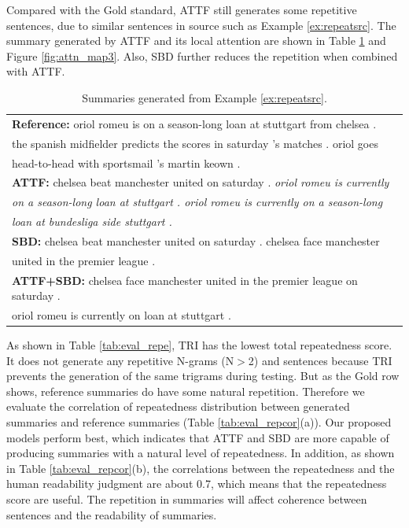 \documentclass{nle}
\theoremstyle{definition}
\newcommand{\figref}[1]{Figure \ref{#1}}
\newcommand{\tabref}[1]{Table \ref{#1}}
\newcommand{\exref}[1]{Example \ref{#1}}
\begin{document}
Compared with the Gold standard,
ATTF still generates some repetitive sentences,
due to similar sentences in source
such as \exref{ex:repeatsrc}.
The summary generated by ATTF and its local attention are
shown in \tabref{tab:src_rep} and \figref{fig:attn_map3}.
Also, SBD further reduces the repetition when combined with ATTF. 

\begin{table}[th!]
	\begin{center}
		\caption{Summaries generated from \exref{ex:repeatsrc}.}
		\begin{tabular}{|l|}%
			\hline \textbf{Reference:} oriol romeu is on a season-long loan at stuttgart from chelsea . \\
			the spanish midfielder predicts the scores in saturday 's matches . oriol goes \\
			head-to-head with sportsmail 's martin keown .\\
			\hline \textbf{ATTF:} chelsea beat manchester united on saturday . \textit{oriol romeu is currently} \\
			\textit{on a season-long loan at stuttgart . oriol romeu is currently on a season-long} \\
			\textit{loan at bundesliga side stuttgart .}\\
			\hline \textbf{SBD:} chelsea beat manchester united on saturday . chelsea face manchester \\
			united in the premier league . \\ 
			\hline \textbf{ATTF+SBD:} chelsea face manchester united in the premier league on saturday . \\
			oriol romeu is currently on loan at stuttgart . \\
			\hline
		\end{tabular}
	\end{center}
	\label{tab:src_rep}
\end{table}

As shown in \tabref{tab:eval_repe}, TRI has the lowest total repeatedness score.
It does not generate any repetitive N-grams (N$>$2) and sentences 
because TRI prevents the generation of the same trigrams during testing.
But as the Gold row shows, reference summaries do have some natural repetition.
Therefore we evaluate the correlation of repeatedness distribution between
generated summaries and reference summaries (\tabref{tab:eval_repcor}(a)).
Our proposed models perform best,
which indicates that ATTF and SBD are more capable of producing summaries with a natural level of repeatedness.
In addition, as shown in \tabref{tab:eval_repcor}(b), the correlations between the repeatedness and the human readability judgment are about 0.7, which means that the repeatedness score are useful. The repetition in summaries will affect coherence between sentences and the readability of summaries.
\end{document}
